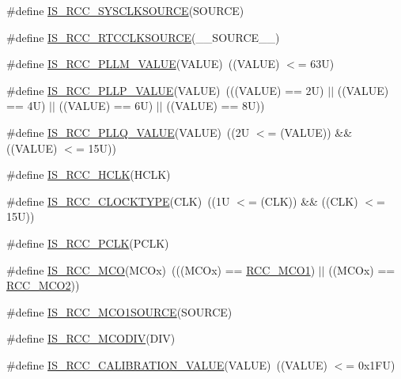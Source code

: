 \begin{DoxyCompactItemize}
\item 
\#define \hyperlink{group___r_c_c___i_s___r_c_c___definitions_ga0797bfc445903525324cbd06a6cebbd2}{I\+S\+\_\+\+R\+C\+C\+\_\+\+S\+Y\+S\+C\+L\+K\+S\+O\+U\+R\+CE}(S\+O\+U\+R\+CE)
\item 
\#define \hyperlink{group___r_c_c___i_s___r_c_c___definitions_gacd1d98013cd9a28e8b1544adf931e7b3}{I\+S\+\_\+\+R\+C\+C\+\_\+\+R\+T\+C\+C\+L\+K\+S\+O\+U\+R\+CE}(\+\_\+\+\_\+\+S\+O\+U\+R\+C\+E\+\_\+\+\_\+)
\item 
\#define \hyperlink{group___r_c_c___i_s___r_c_c___definitions_ga8db327c085e20aeb673a9784f8508597}{I\+S\+\_\+\+R\+C\+C\+\_\+\+P\+L\+L\+M\+\_\+\+V\+A\+L\+UE}(V\+A\+L\+UE)~((V\+A\+L\+UE) $<$= 63\+U)
\item 
\#define \hyperlink{group___r_c_c___i_s___r_c_c___definitions_gad808f83505f4e802e5bafab7831f0235}{I\+S\+\_\+\+R\+C\+C\+\_\+\+P\+L\+L\+P\+\_\+\+V\+A\+L\+UE}(V\+A\+L\+UE)~(((V\+A\+L\+UE) == 2\+U) $\vert$$\vert$ ((\+V\+A\+L\+U\+E) == 4\+U) $\vert$$\vert$ ((\+V\+A\+L\+U\+E) == 6\+U) $\vert$$\vert$ ((\+V\+A\+L\+U\+E) == 8\+U))
\item 
\#define \hyperlink{group___r_c_c___i_s___r_c_c___definitions_gad66dbe75bf8ab2b64b200e796281a851}{I\+S\+\_\+\+R\+C\+C\+\_\+\+P\+L\+L\+Q\+\_\+\+V\+A\+L\+UE}(V\+A\+L\+UE)~((2\+U $<$= (\+V\+A\+L\+U\+E)) \&\& ((\+V\+A\+L\+U\+E) $<$= 15\+U))
\item 
\#define \hyperlink{group___r_c_c___i_s___r_c_c___definitions_ga6e9f1c193a2f41bcb3c2f7fa8459b5b3}{I\+S\+\_\+\+R\+C\+C\+\_\+\+H\+C\+LK}(H\+C\+LK)
\item 
\#define \hyperlink{group___r_c_c___i_s___r_c_c___definitions_gaedf7abbab300ed340b88d5f665910707}{I\+S\+\_\+\+R\+C\+C\+\_\+\+C\+L\+O\+C\+K\+T\+Y\+PE}(C\+LK)~((1\+U $<$= (\+C\+L\+K)) \&\& ((\+C\+L\+K) $<$= 15\+U))
\item 
\#define \hyperlink{group___r_c_c___i_s___r_c_c___definitions_gab70f1257ea47c1da4def8e351af4d9f2}{I\+S\+\_\+\+R\+C\+C\+\_\+\+P\+C\+LK}(P\+C\+LK)
\item 
\#define \hyperlink{group___r_c_c___i_s___r_c_c___definitions_gaac2d2f9b0c3e2f4fbe2131d779080964}{I\+S\+\_\+\+R\+C\+C\+\_\+\+M\+CO}(M\+C\+Ox)~(((M\+C\+Ox) == \hyperlink{group___r_c_c___m_c_o___index_ga152dd1ae9455e528526c4e23a817937b}{R\+C\+C\+\_\+\+M\+C\+O1}) $\vert$$\vert$ ((M\+C\+Ox) == \hyperlink{group___r_c_c___m_c_o___index_ga248f59fc2868f83bea4f2d182edcdf4c}{R\+C\+C\+\_\+\+M\+C\+O2}))
\item 
\#define \hyperlink{group___r_c_c___i_s___r_c_c___definitions_ga073031d9c90c555f7874912b7e4905f6}{I\+S\+\_\+\+R\+C\+C\+\_\+\+M\+C\+O1\+S\+O\+U\+R\+CE}(S\+O\+U\+R\+CE)
\item 
\#define \hyperlink{group___r_c_c___i_s___r_c_c___definitions_ga152403e1f22fd14bb9a5d86406fe593f}{I\+S\+\_\+\+R\+C\+C\+\_\+\+M\+C\+O\+D\+IV}(D\+IV)
\item 
\#define \hyperlink{group___r_c_c___i_s___r_c_c___definitions_gafda50a08dc048f7c272bf04ec9c2c2b7}{I\+S\+\_\+\+R\+C\+C\+\_\+\+C\+A\+L\+I\+B\+R\+A\+T\+I\+O\+N\+\_\+\+V\+A\+L\+UE}(V\+A\+L\+UE)~((V\+A\+L\+UE) $<$= 0x1\+F\+U)
\end{DoxyCompactItemize}


